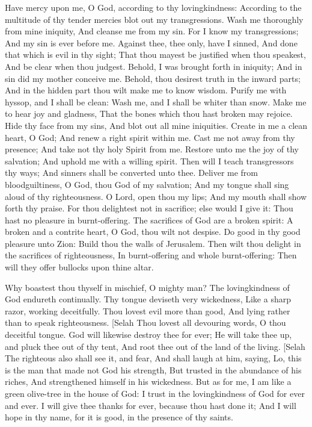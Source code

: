 Have mercy upon me, O God, according to thy lovingkindness: According to the multitude of thy tender mercies blot out my transgressions.  Wash me thoroughly from mine iniquity, And cleanse me from my sin.  For I know my transgressions; And my sin is ever before me.  Against thee, thee only, have I sinned, And done that which is evil in thy sight; That thou mayest be justified when thou speakest, And be clear when thou judgest.  Behold, I was brought forth in iniquity; And in sin did my mother conceive me.  Behold, thou desirest truth in the inward parts; And in the hidden part thou wilt make me to know wisdom.  Purify me with hyssop, and I shall be clean: Wash me, and I shall be whiter than snow.  Make me to hear joy and gladness, That the bones which thou hast broken may rejoice.  Hide thy face from my sins, And blot out all mine iniquities.  Create in me a clean heart, O God; And renew a right spirit within me.  Cast me not away from thy presence; And take not thy holy Spirit from me.  Restore unto me the joy of thy salvation; And uphold me with a willing spirit.  Then will I teach transgressors thy ways; And sinners shall be converted unto thee.  Deliver me from bloodguiltiness, O God, thou God of my salvation; And my tongue shall sing aloud of thy righteousness.  O Lord, open thou my lips; And my mouth shall show forth thy praise.  For thou delightest not in sacrifice; else would I give it: Thou hast no pleasure in burnt-offering.  The sacrifices of God are a broken spirit: A broken and a contrite heart, O God, thou wilt not despise.  Do good in thy good pleasure unto Zion: Build thou the walls of Jerusalem.  Then wilt thou delight in the sacrifices of righteousness, In burnt-offering and whole burnt-offering: Then will they offer bullocks upon thine altar. 

Why boastest thou thyself in mischief, O mighty man? The lovingkindness of God endureth continually.  Thy tongue deviseth very wickedness, Like a sharp razor, working deceitfully.  Thou lovest evil more than good, And lying rather than to speak righteousness. [Selah  Thou lovest all devouring words, O thou deceitful tongue.  God will likewise destroy thee for ever; He will take thee up, and pluck thee out of thy tent, And root thee out of the land of the living. [Selah  The righteous also shall see it, and fear, And shall laugh at him, saying,  Lo, this is the man that made not God his strength, But trusted in the abundance of his riches, And strengthened himself in his wickedness.  But as for me, I am like a green olive-tree in the house of God: I trust in the lovingkindness of God for ever and ever.  I will give thee thanks for ever, because thou hast done it; And I will hope in thy name, for it is good, in the presence of thy saints. 

